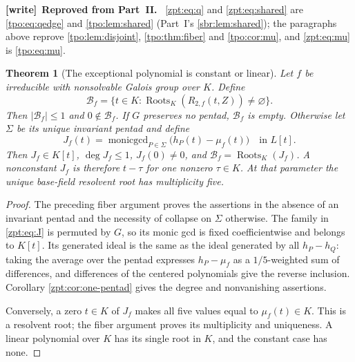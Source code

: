 \documentclass[11pt,letterpaper]{article}
\numberwithin{equation}{section}
\newtheorem{theorem}{Theorem}[section]
\theoremstyle{definition}
\theoremstyle{remark}
\newcommand{\Rtwo}{R_{2,f}}
\DeclareMathOperator{\Roots}{Roots}
\newcommand{\roots}[1]{\Roots_K(#1)}
\newenvironment{writenote}[1][]{\par\smallskip\begingroup\small
 \noindent\textbf{[write]}\if\relax\detokenize{#1}\relax\else~\textbf{#1.}\fi\ }%
 {\par\endgroup\smallskip}
\begin{document}
\begin{writenote}[Reproved from Part~II]
\eqref{zpt:eq:q} and \eqref{zpt:eq:shared} are \eqref{tpo:eq:qedge} and
\cref{tpo:lem:shared} (Part~I's \cref{sbr:lem:shared}); the paragraphs above
reprove \cref{tpo:lem:disjoint}, \cref{tpo:thm:fiber} and \cref{tpo:cor:mu},
and \eqref{zpt:eq:mu} is \eqref{tpo:eq:mu}.
\end{writenote}

\begin{theorem}[The exceptional polynomial is constant or linear]
\label{zpt:thm:exceptional}
Let $f$ be irreducible with nonsolvable Galois group over $K$. Define
\[
 \mathcal B_f=\{t\in K:\roots{\Rtwo(t,Z)}\ne\varnothing\}.
\]
Then $|\mathcal B_f|\le1$ and $0\notin\mathcal B_f$.
If $G$ preserves no pentad, $\mathcal B_f$ is empty. Otherwise let
$\Sigma$ be its unique invariant pentad and define
\begin{equation}
 J_f(t)=\operatorname{monicgcd}_{P\in\Sigma}
           \bigl(h_P(t)-\mu_f(t)\bigr)\quad\text{in }L[t].\label{zpt:eq:J}
\end{equation}
Then $J_f\in K[t]$, $\deg J_f\le1$, $J_f(0)\ne0$, and
$\mathcal B_f=\roots{J_f}$. A nonconstant $J_f$ is therefore $t-\tau$
for one nonzero $\tau\in K$. At that parameter the unique base-field
resolvent root has multiplicity five.
\end{theorem}
\begin{proof}
The preceding fiber argument proves the assertions in the absence of an
invariant pentad and the necessity of collapse on $\Sigma$ otherwise.
The family in \eqref{zpt:eq:J} is permuted by $G$, so its monic gcd is fixed
coefficientwise and belongs to $K[t]$. Its generated ideal is the same as
the ideal generated by all $h_P-h_Q$: taking the average over the pentad
expresses $h_P-\mu_f$ as a $1/5$-weighted sum of differences, and differences
of the centered polynomials give the reverse inclusion. Corollary
\ref{zpt:cor:one-pentad} gives the degree and nonvanishing assertions.

Conversely, a zero $t\in K$ of $J_f$ makes all five values equal to
$\mu_f(t)\in K$. This is a resolvent root; the fiber argument proves its
multiplicity and uniqueness. A linear polynomial over $K$ has its single
root in $K$, and the constant case has none.
\end{proof}
\end{document}
